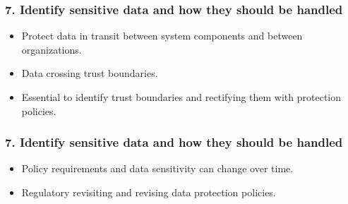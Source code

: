 \documentclass[12pt,norsk]{beamer}
\begin{document}
\begin{frame}

	\frametitle{7. Identify sensitive data and how they should be handled}
	\begin{itemize}

		\item Protect data in transit between system components and between organizations.
		\item Data crossing trust boundaries.
		\item Essential to identify trust boundaries and rectifying them with protection policies.
		
		
		
	\end{itemize}
	

\end{frame}


\begin{frame}

	\frametitle{7. Identify sensitive data and how they should be handled}
	\begin{itemize}

		\item Policy requirements and data sensitivity can change over time.
		\item Regulatory revisiting and revising data protection policies.		
		
	\end{itemize}
	

\end{frame}

\end{document}
